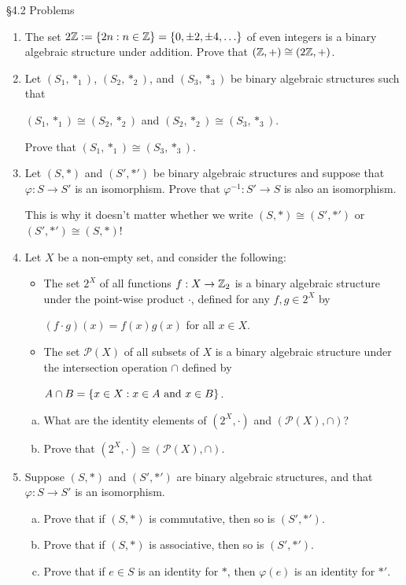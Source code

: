 \documentclass[11pt,fleqn,dvipsnames,usenames]{article}
\begin{document}
{\huge \S4.2 Problems}
\vsp

\begin{enumerate}[1.]
\item The set $2\mathbb{Z} := \left\{2n:n\in\mathbb{Z}\right\} = \left\{0, \pm 2, \pm 4,\ldots\right\}$ of even integers is a binary algebraic structure under addition.  Prove that $(\mathbb{Z},+)\cong (2\mathbb{Z},+)$.
%
\item Let $(S_{1},*_{1})$, $(S_{2}, *_{2})$, and $(S_{3}, *_{3})$ be binary algebraic structures such that
\begin{center}
$(S_{1},*_{1})\cong(S_{2},*_{2})$ and $(S_{2},*_{2})\cong(S_{3},*_{3})$.
\end{center}
Prove that $(S_{1},*_{1})\cong(S_{3},*_{3})$.
%
\item Let $(S,*)$ and $(S',*')$ be binary algebraic structures and suppose that $\varphi:S\to S'$ is an isomorphism.  Prove that $\varphi^{-1}:S'\to S$ is also an isomorphism.

\note This is why it doesn't matter whether we write $(S,*)\cong (S',*')$ or $(S',*')\cong (S,*)$!
%
\item Let $X$ be a non-empty set, and consider the following:
\begin{itemize}
\item The set $2^{X}$ of all functions $f:X\to\mathbb{Z}_{2}$ is a binary algebraic structure under the point-wise product $\cdot$, defined for any $f,g\in 2^{X}$ by
\begin{center}
$(f \cdot g)(x) = f(x)g(x)$ for all $x\in X$.
\end{center}
\item The set $\mathcal{P}(X)$ of all subsets of $X$ is a binary algebraic structure under the intersection operation $\cap$ defined by
\begin{center}
$A\cap B = \left\{x\in X:x\in A\text{ and }x\in B\right\}$.
\end{center}
\end{itemize}
\begin{enumerate}[(a)]
\item What are the identity elements of $(2^{X}, \cdot)$ and $(\mathcal{P}(X), \cap)$?
\item Prove that $(2^{X}, \cdot)\cong (\mathcal{P}(X), \cap)$.
\end{enumerate}
%
\item Suppose $(S,*)$ and $(S',*')$ are binary algebraic structures, and that $\varphi:S\to S'$ is an isomorphism.
\begin{enumerate}[(a)]
\item Prove that if $(S,*)$ is commutative, then so is $(S',*')$.
\item Prove that if $(S,*)$ is associative, then so is $(S',*')$.
\item Prove that if $e\in S$ is an identity for $*$, then $\varphi(e)$ is an identity for $*'$.
\end{enumerate}
\end{enumerate}
\end{document}
